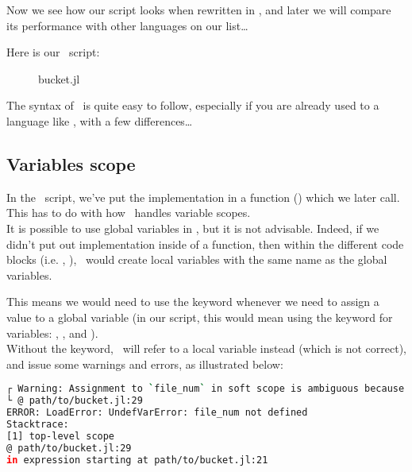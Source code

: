 \bigskip

Now we see how our script looks when rewritten in \julia, and later we will compare its performance with other languages on our list\dots
\\

\newpage

Here is our \julia\ script:

\begin{figure}[h]
	\caption{bucket.jl}
	
\end{figure}

\bigskip


The syntax of \julia\ is quite easy to follow, especially if you are already used to a language like \python, with a few differences\dots \\


\subsection*{Variables scope}

In the \julia\ script, we've put the implementation in a function () which we later call. This has to do with how \julia\ handles variable scopes. \\

It is possible to use global variables in \julia, but it is not advisable. Indeed, if we didn't put out implementation inside of a function, then within the different code blocks (i.e. , ), \julia\ would create local variables with the same name as the global variables. 

This means we would need to use the  keyword whenever we need to assign a value to a global variable (in our script, this would mean using the  keyword for variables: , , and ). \\


Without the  keyword, \julia\ will refer to a local variable instead (which is not correct), and issue some warnings and errors, as illustrated below: \\

\begin{lstlisting}[language=sh]
┌ Warning: Assignment to `file_num` in soft scope is ambiguous because a global variable by the same name exists: `file_num` will be treated as a new local. Disambiguate by using `local file_num` to suppress this warning or `global file_num` to assign to the existing global variable.
└ @ path/to/bucket.jl:29
ERROR: LoadError: UndefVarError: file_num not defined
Stacktrace:
[1] top-level scope
@ path/to/bucket.jl:29
in expression starting at path/to/bucket.jl:21
\end{lstlisting}

